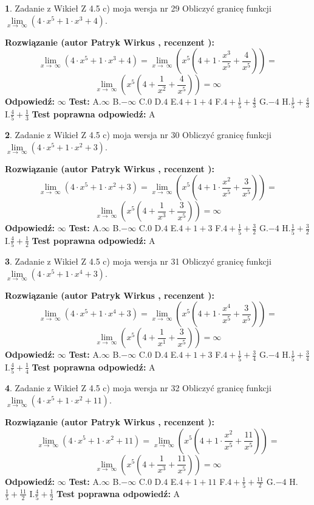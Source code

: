 \documentclass[12pt, a4paper]{article}
\theoremstyle{definition} %
\newtheorem{zad}{}
\newcommand{\zadStart}[1]{\begin{zad}#1\newline}
\newcommand{\zadStop}{\end{zad}}
\newcommand{\rozwStart}[2]{\noindent \textbf{Rozwiązanie (autor #1 , recenzent #2): }\newline}
\newcommand{\rozwStop}{\newline}
\newcommand{\odpStart}{\noindent \textbf{Odpowiedź:}\newline}
\newcommand{\odpStop}{\newline}
\newcommand{\testStart}{\noindent \textbf{Test:}\newline}
\newcommand{\testStop}{\newline}
\newcommand{\kluczStart}{\noindent \textbf{Test poprawna odpowiedź:}\newline}
\newcommand{\kluczStop}{\newline}
\begin{document}
\zadStart{Zadanie z Wikieł Z 4.5 c) moja wersja nr 29}
Obliczyć granicę funkcji  $\lim\limits_{x\to\ \infty}(4 \cdot x^{5}+1 \cdot x^{3}+4)$.
\zadStop
\rozwStart{Patryk Wirkus}{}
$$\lim\limits_{x\to\ \infty}(4 \cdot x^{5}+1 \cdot x^{3}+4) = \lim\limits_{x\to\ \infty}(x^{5}(4 +1 \cdot \frac{x^{3}}{x^{5}}+\frac{4}{x^{5}})) =$$ $$\lim\limits_{x\to\ \infty}(x^{5}(4 +\frac{1}{x^{2}}+\frac{4}{x^{5}})) =\infty$$
\rozwStop
\odpStart
$\infty$
\odpStop
\testStart
A.$\infty$ B.$-\infty$ C.$0$ D.$4$ E.$4 + 1 + 4$
F.$4+\frac{1}{5}+\frac{4}{3}$ G.$-4$
H.$\frac{1}{5}+\frac{4}{3}$
I.$\frac{4}{5}+\frac{1}{3}$
\testStop
\kluczStart
A
\kluczStop



\zadStart{Zadanie z Wikieł Z 4.5 c) moja wersja nr 30}
Obliczyć granicę funkcji  $\lim\limits_{x\to\ \infty}(4 \cdot x^{5}+1 \cdot x^{2}+3)$.
\zadStop
\rozwStart{Patryk Wirkus}{}
$$\lim\limits_{x\to\ \infty}(4 \cdot x^{5}+1 \cdot x^{2}+3) = \lim\limits_{x\to\ \infty}(x^{5}(4 +1 \cdot \frac{x^{2}}{x^{5}}+\frac{3}{x^{5}})) =$$ $$\lim\limits_{x\to\ \infty}(x^{5}(4 +\frac{1}{x^{3}}+\frac{3}{x^{5}})) =\infty$$
\rozwStop
\odpStart
$\infty$
\odpStop
\testStart
A.$\infty$ B.$-\infty$ C.$0$ D.$4$ E.$4 + 1 + 3$
F.$4+\frac{1}{5}+\frac{3}{2}$ G.$-4$
H.$\frac{1}{5}+\frac{3}{2}$
I.$\frac{4}{5}+\frac{1}{2}$
\testStop
\kluczStart
A
\kluczStop



\zadStart{Zadanie z Wikieł Z 4.5 c) moja wersja nr 31}
Obliczyć granicę funkcji  $\lim\limits_{x\to\ \infty}(4 \cdot x^{5}+1 \cdot x^{4}+3)$.
\zadStop
\rozwStart{Patryk Wirkus}{}
$$\lim\limits_{x\to\ \infty}(4 \cdot x^{5}+1 \cdot x^{4}+3) = \lim\limits_{x\to\ \infty}(x^{5}(4 +1 \cdot \frac{x^{4}}{x^{5}}+\frac{3}{x^{5}})) =$$ $$\lim\limits_{x\to\ \infty}(x^{5}(4 +\frac{1}{x^{1}}+\frac{3}{x^{5}})) =\infty$$
\rozwStop
\odpStart
$\infty$
\odpStop
\testStart
A.$\infty$ B.$-\infty$ C.$0$ D.$4$ E.$4 + 1 + 3$
F.$4+\frac{1}{5}+\frac{3}{4}$ G.$-4$
H.$\frac{1}{5}+\frac{3}{4}$
I.$\frac{4}{5}+\frac{1}{4}$
\testStop
\kluczStart
A
\kluczStop



\zadStart{Zadanie z Wikieł Z 4.5 c) moja wersja nr 32}
Obliczyć granicę funkcji  $\lim\limits_{x\to\ \infty}(4 \cdot x^{5}+1 \cdot x^{2}+11)$.
\zadStop
\rozwStart{Patryk Wirkus}{}
$$\lim\limits_{x\to\ \infty}(4 \cdot x^{5}+1 \cdot x^{2}+11) = \lim\limits_{x\to\ \infty}(x^{5}(4 +1 \cdot \frac{x^{2}}{x^{5}}+\frac{11}{x^{5}})) =$$ $$\lim\limits_{x\to\ \infty}(x^{5}(4 +\frac{1}{x^{3}}+\frac{11}{x^{5}})) =\infty$$
\rozwStop
\odpStart
$\infty$
\odpStop
\testStart
A.$\infty$ B.$-\infty$ C.$0$ D.$4$ E.$4 + 1 + 11$
F.$4+\frac{1}{5}+\frac{11}{2}$ G.$-4$
H.$\frac{1}{5}+\frac{11}{2}$
I.$\frac{4}{5}+\frac{1}{2}$
\testStop
\kluczStart
A
\kluczStop
\end{document}
